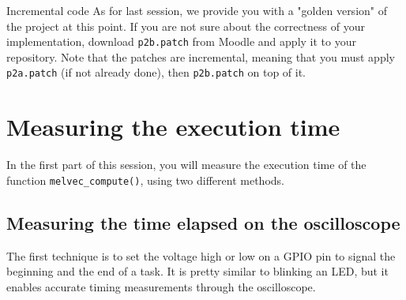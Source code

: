 \begin{bclogo}[couleur = gray!20, arrondi = 0.2, logo=\bcattention]{Incremental code}
As for last session, we provide you with a "golden version" of the project at this point. If you are not sure about the correctness of your implementation, download \texttt{p2b.patch} from Moodle and apply it to your repository. Note that the patches are incremental, meaning that you must apply \texttt{p2a.patch} (if not already done), then \texttt{p2b.patch} on top of it.
\end{bclogo}

\section{Measuring the execution time}

In the first part of this session, you will measure the execution time of the function \texttt{melvec\_compute()}, using two different methods.

\subsection{Measuring the time elapsed on the oscilloscope}

The first technique is to set the voltage high or low on a GPIO pin to signal the beginning and the end of a task. It is pretty similar to blinking an LED, but it enables accurate timing measurements through the oscilloscope.

